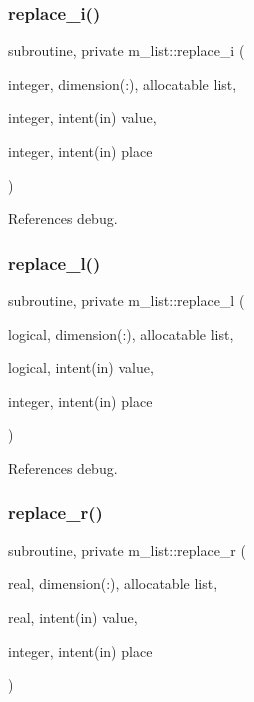 \subsubsection{\texorpdfstring{replace\+\_\+i()}{replace\_i()}}
{\footnotesize\ttfamily subroutine, private m\+\_\+list\+::replace\+\_\+i (\begin{DoxyParamCaption}\item[{integer, dimension(\+:), allocatable}]{list,  }\item[{integer, intent(in)}]{value,  }\item[{integer, intent(in)}]{place }\end{DoxyParamCaption})\hspace{0.3cm}{\ttfamily [private]}}



References debug.

\mbox{\label{namespacem__list_a0de977b7f38554ccd2e8b6e668f11648}} 
\subsubsection{\texorpdfstring{replace\+\_\+l()}{replace\_l()}}
{\footnotesize\ttfamily subroutine, private m\+\_\+list\+::replace\+\_\+l (\begin{DoxyParamCaption}\item[{logical, dimension(\+:), allocatable}]{list,  }\item[{logical, intent(in)}]{value,  }\item[{integer, intent(in)}]{place }\end{DoxyParamCaption})\hspace{0.3cm}{\ttfamily [private]}}



References debug.

\mbox{\label{namespacem__list_ac2ef50718d66bfe2fc102a3d48a28cb2}} 
\subsubsection{\texorpdfstring{replace\+\_\+r()}{replace\_r()}}
{\footnotesize\ttfamily subroutine, private m\+\_\+list\+::replace\+\_\+r (\begin{DoxyParamCaption}\item[{real, dimension(\+:), allocatable}]{list,  }\item[{real, intent(in)}]{value,  }\item[{integer, intent(in)}]{place }\end{DoxyParamCaption})\hspace{0.3cm}{\ttfamily [private]}}



